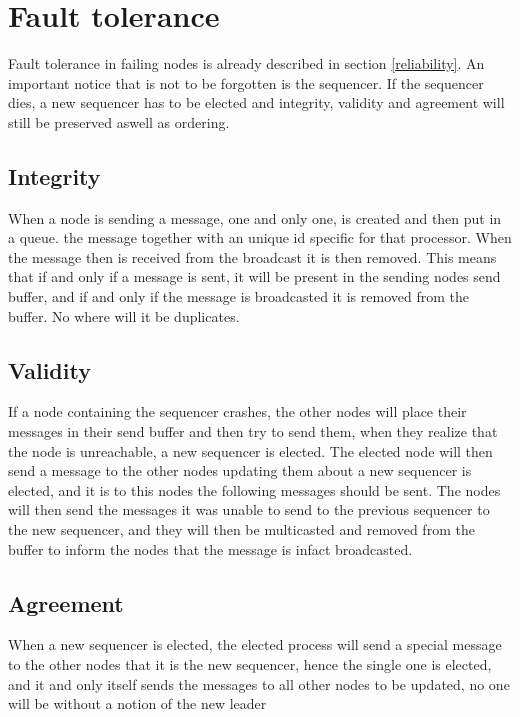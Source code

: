 \documentclass{article}
\begin{document}
\section{Fault tolerance}
  Fault tolerance in failing nodes is already described in section \ref{reliability}.
  An important notice that is not to be forgotten is the sequencer. If the sequencer 
  dies, a new sequencer has to be elected and integrity, validity and agreement will 
  still be preserved aswell as ordering.
  \subsection{Integrity}
    When a node is sending a message, one and only one, is created and then put in a queue.
    the message together with an unique id specific for that processor. When the message then is 
    received from the broadcast it is then removed. This means that if and only if a message is 
    sent, it    will be present in the sending nodes send buffer, and if and only if the message
    is broadcasted it is removed from the buffer. No where will it be duplicates.
    
  \subsection{Validity}
    If a node containing the sequencer crashes, the other nodes will place their messages in their
    send buffer and then try to send them, when they realize that the node is unreachable, a new 
    sequencer is elected. The elected node will then send a message to the other nodes updating them
    about a new sequencer is elected, and it is to this nodes the following messages should be sent.
    The nodes will then send the messages it was unable to send to the previous sequencer to the
    new sequencer, and they will then be multicasted and removed from the buffer to inform the nodes
    that the message is infact broadcasted.
  \subsection{Agreement}
    When a new sequencer is elected, the elected process will send a special message to the other nodes
    that it is the new sequencer, hence the single one is elected, and it and only itself sends the 
    messages to all other nodes to be updated, no one will be without a notion of the new leader
\end{document}

